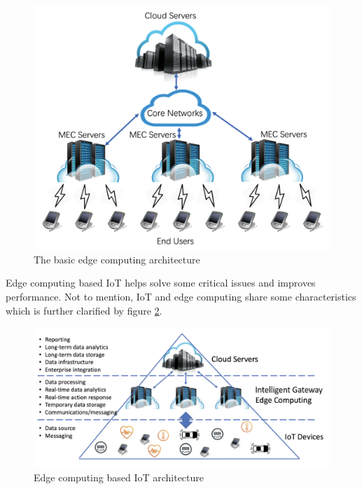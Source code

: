 \begin{figure}
    \begin{center}
        \includegraphics[scale=0.35]{Figs/edge_arch.png}    
    \end{center}
    \caption{The basic edge computing architecture \cite{8123913}}
    \label{fig:edgearch}
\end{figure}

Edge computing based IoT helps solve some critical issues and improves performance. Not to mention, IoT and 
edge computing share some characteristics which is further clarified by figure \ref{fig:edgeiot}. 
\begin{figure}
    \begin{center}
        \includegraphics[scale=0.35]{Figs/edge_iot.png}    
    \end{center}
    \caption{Edge computing based IoT architecture \cite{8123913}}
    \label{fig:edgeiot}
\end{figure}

